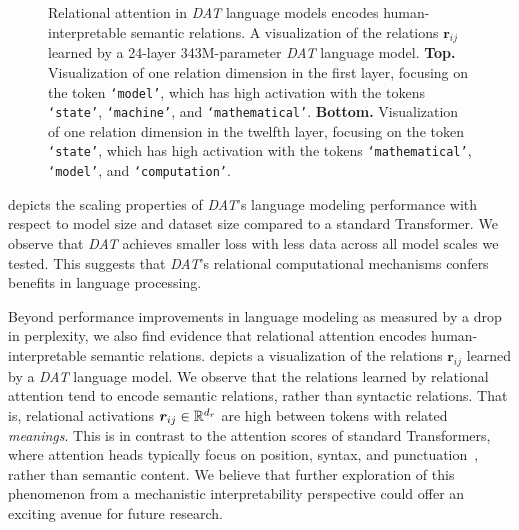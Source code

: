 \begin{figure}[t]
\begin{subfigure}[t]{\textwidth}
    \end{subfigure}
    \caption{Relational attention in \textit{DAT} language models encodes human-interpretable semantic relations. A visualization of the relations $\boldsymbol{r}_{ij}$ learned by a 24-layer 343M-parameter \textit{DAT} language model. \textbf{Top.} Visualization of one relation dimension in the first layer, focusing on the token \texttt{`model'}, which has high activation with the tokens \texttt{`state'}, \texttt{`machine'}, and \texttt{`mathematical'}. \textbf{Bottom.} Visualization of one relation dimension in the twelfth layer, focusing on the token \texttt{`state'}, which has high activation with the tokens \texttt{`mathematical'}, \texttt{`model'}, and \texttt{`computation'}.}\label{fig:datlm_viz}
\end{figure}

 depicts the scaling properties of \textit{DAT}'s language modeling performance with respect to model size and dataset size compared to a standard Transformer. We observe that \textit{DAT} achieves smaller loss with less data across all model scales we tested. This suggests that \textit{DAT}'s relational computational mechanisms confers benefits in language processing.

Beyond performance improvements in language modeling as measured by a drop in perplexity, we also find evidence that relational attention encodes human-interpretable semantic relations.  depicts a visualization of the relations $\boldsymbol{r}_{ij}$ learned by a \textit{DAT} language model. We observe that the relations learned by relational attention tend to encode semantic relations, rather than syntactic relations. That is, relational activations $\boldsymbol{r}_{ij} \in \mathbb{R}^{d_r}$ are high between tokens with related \textit{meanings}. This is in contrast to the attention scores of standard Transformers, where attention heads typically focus on position, syntax, and punctuation~\citep{clark2019doesbertlookat,htut2019attentionheadsberttrack,elhage2021mathematical}, rather than semantic content. We believe that further exploration of this phenomenon from a mechanistic interpretability perspective could offer an exciting avenue for future research.



